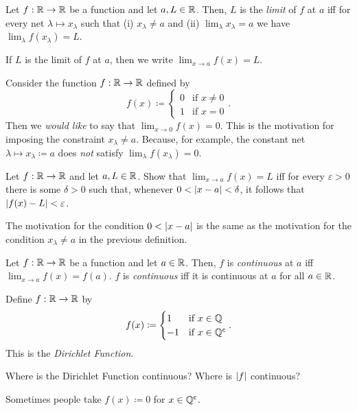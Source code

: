 \begin{dfn}\label{dfn3.4.1}
Let $f:\mathbb{R} \rightarrow \mathbb{R}$ be a function and let $a,L\in \mathbb{R}$.  Then, $L$ is the \emph{limit} of $f$ at $a$ iff for every net $\lambda \mapsto x_\lambda$ such that (i) $x_\lambda \neq a$ and (ii) $\lim _\lambda x_\lambda =a$ we have $\lim _\lambda f(x_\lambda )=L$.
\begin{rmk}
If $L$ is the limit of $f$ at $a$, then we write $\lim _{x\to a}f(x)=L$.
\end{rmk}
\begin{rmk}
Consider the function $f:\mathbb{R} \rightarrow \mathbb{R}$ defined by
\begin{equation}
f(x)\coloneqq \begin{cases}0 & \text{if }x\neq 0 \\ 1 & \text{if }x=0\end{cases}.
\end{equation}
Then we \emph{would like} to say that $\lim _{x\to 0}f(x)=0$.  This is the motivation for imposing the constraint $x_\lambda \neq a$.  Because, for example, the constant net $\lambda \mapsto x_\lambda \coloneqq a$ does \emph{not} satisfy $\lim _\lambda f(x_\lambda )=0$.
\end{rmk}
\end{dfn}
\begin{exr}
Let $f:\mathbb{R} \rightarrow \mathbb{R}$ and let $a,L\in \mathbb{R}$.  Show that $\lim _{x\to a}f(x)=L$ iff for every $\varepsilon >0$ there is some $\delta >0$ such that, whenever $0<\lvert x-a\rvert<\delta$, it follows that $\lvert f(x)-L\rvert<\varepsilon$.
\begin{rmk}
The motivation for the condition $0<\lvert x-a\rvert$ is the same as the motivation for the condition $x_\lambda \neq a$ in the previous definition.
\end{rmk}
\end{exr}
\begin{dfn}
Let $f:\mathbb{R} \rightarrow \mathbb{R}$ be a function and let $a\in \mathbb{R}$.  Then, $f$ is \emph{continuous} at $a$ iff $\lim _{x\to a}f(x)=f(a)$.  $f$ is \emph{continuous} iff it is continuous at $a$ for all $a\in \mathbb{R}$.
\end{dfn}
\begin{exm}\label{exmDirichletFunction}
Define $f:\mathbb{R} \rightarrow \mathbb{R}$ by
\begin{equation}
f(x)\coloneqq \begin{cases}1 & \text{if }x\in \mathbb{Q} \\ -1 & \text{if }x\in \mathbb{Q} ^{\mathsf{c}}\end{cases}.
\end{equation}
This is the \emph{Dirichlet Function}.
\begin{exr}
Where is the Dirichlet Function continuous?  Where is $\lvert f\rvert$ continuous?
\end{exr}
\begin{rmk}
Sometimes people take $f(x)\coloneqq 0$ for $x\in \mathbb{Q} ^{\mathsf{c}}$.
\end{rmk}
\end{exm}
